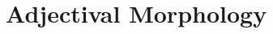 \documentclass[grammar]{subfiles}
\begin{document}
  \chapter{Adjectival Morphology}
  \label{ch:adjectival-morphology}

  \textbf{\ToBeWritten}

%
%
%
%
%
\end{document}
